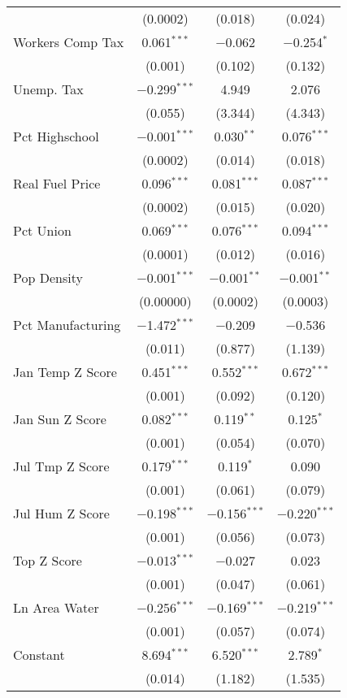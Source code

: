 \begin{table}[!htbp]
\begin{tabular}{@{\extracolsep{5pt}}lccc}
  & (0.0002) & (0.018) & (0.024) \\ 
  Workers Comp Tax & 0.061$^{***}$ & $-$0.062 & $-$0.254$^{*}$ \\ 
  & (0.001) & (0.102) & (0.132) \\ 
  Unemp. Tax & $-$0.299$^{***}$ & 4.949 & 2.076 \\ 
  & (0.055) & (3.344) & (4.343) \\ 
  Pct Highschool & $-$0.001$^{***}$ & 0.030$^{**}$ & 0.076$^{***}$ \\ 
  & (0.0002) & (0.014) & (0.018) \\ 
  Real Fuel Price & 0.096$^{***}$ & 0.081$^{***}$ & 0.087$^{***}$ \\ 
  & (0.0002) & (0.015) & (0.020) \\ 
  Pct Union & 0.069$^{***}$ & 0.076$^{***}$ & 0.094$^{***}$ \\ 
  & (0.0001) & (0.012) & (0.016) \\ 
  Pop Density & $-$0.001$^{***}$ & $-$0.001$^{**}$ & $-$0.001$^{**}$ \\ 
  & (0.00000) & (0.0002) & (0.0003) \\ 
  Pct Manufacturing & $-$1.472$^{***}$ & $-$0.209 & $-$0.536 \\ 
  & (0.011) & (0.877) & (1.139) \\ 
  Jan Temp Z Score & 0.451$^{***}$ & 0.552$^{***}$ & 0.672$^{***}$ \\ 
  & (0.001) & (0.092) & (0.120) \\ 
  Jan Sun Z Score & 0.082$^{***}$ & 0.119$^{**}$ & 0.125$^{*}$ \\ 
  & (0.001) & (0.054) & (0.070) \\ 
  Jul Tmp Z Score & 0.179$^{***}$ & 0.119$^{*}$ & 0.090 \\ 
  & (0.001) & (0.061) & (0.079) \\ 
  Jul Hum Z Score & $-$0.198$^{***}$ & $-$0.156$^{***}$ & $-$0.220$^{***}$ \\ 
  & (0.001) & (0.056) & (0.073) \\ 
  Top Z Score & $-$0.013$^{***}$ & $-$0.027 & 0.023 \\ 
  & (0.001) & (0.047) & (0.061) \\ 
  Ln Area Water & $-$0.256$^{***}$ & $-$0.169$^{***}$ & $-$0.219$^{***}$ \\ 
  & (0.001) & (0.057) & (0.074) \\ 
  Constant & 8.694$^{***}$ & 6.520$^{***}$ & 2.789$^{*}$ \\ 
  & (0.014) & (1.182) & (1.535) \\ 

\end{tabular}
\end{table}
